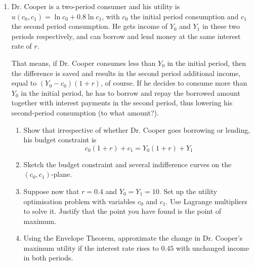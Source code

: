 \begin{enumerate}[resume]
\item Dr. Cooper is a two-period consumer and his utility is $u(c_0 , c_1) = \ln c_0 + 0.8 \ln c_1$, with $c_0$ the initial period consumption and $c_1$ the second period consumption. He gets income of $Y_0$ and $Y_1$ in these two periods respectively, and can borrow and lend money at the same interest rate of $r$.


That means, if Dr. Cooper consumes less than $Y_0$ in the initial period, then the difference is saved and results in the second period additional income, equal to $(Y_0 - c_0)(1 + r)$, of course. If he decides to consume more than $Y_0$ in the initial period, he has to borrow and repay the borrowed amount together with interest payments in the second period, thus lowering his second-period consumption (to what amount?).
\begin{enumerate}
\item Show that irrespective of whether Dr. Cooper goes borrowing or lending, his budget
constraint is
\[
c_0 (1 + r) + c_1 = Y_0 (1 + r) + Y_1
\]
\item Sketch the budget constraint and several indifference curves on the $(c_0 , c_1)$-plane.
\item Suppose now that $r = 0.4$ and $Y_0 = Y_1 = 10$. Set up the utility optimisation problem with variables $c_0$ and $c_1$. Use Lagrange multipliers to solve it. Justify that the point you have found is the point of maximum.
\item Using the Envelope Theorem, approximate the change in Dr. Cooper’s maximum
utility if the interest rate rises to $0.45$ with unchanged income in both periods.
\end{enumerate}


\end{enumerate}
